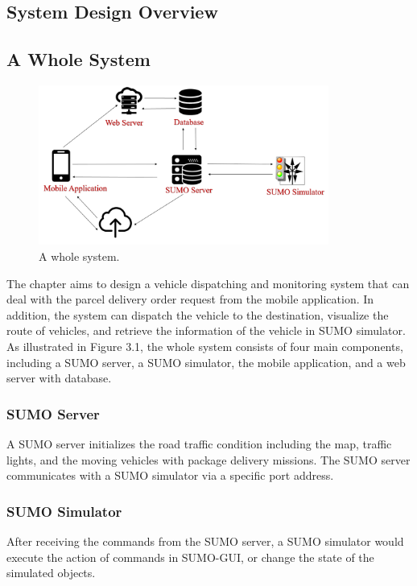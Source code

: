 \documentclass[12pt]{ksthesis}
\begin{document}
\begin{thesis}
{\chapter{System Design Overview}\label{Chap:Architecture}

\section{A Whole System}

\begin{figure}[t!]
\centering
\includegraphics[width=0.85\textwidth]{./Thesis_figures/F3-1_a_whole_system.PNG}
\caption{\large A whole system.}
\vspace{0.5cm}
\label{Fig:A_Whole_System}
\end{figure}

The chapter aims to design a vehicle dispatching and monitoring system that can deal with the parcel delivery order request from the mobile application. In addition, the system can dispatch the vehicle to the destination, visualize the route of vehicles, and retrieve the information of the vehicle in SUMO simulator.
As illustrated in Figure 3.1, the whole system consists of four main components, including a SUMO server, a SUMO simulator, the mobile application, and a web server with database.

\subsection{SUMO Server}
A SUMO server initializes the road traffic condition including the map, traffic lights, and the moving vehicles with package delivery missions. The SUMO server communicates with a SUMO simulator via a specific port address.

\subsection{SUMO Simulator}
After receiving the commands from the SUMO server, a SUMO simulator would execute the action of commands in SUMO-GUI,  or change the state of the simulated objects.

}
\end{thesis}
\end{document}
